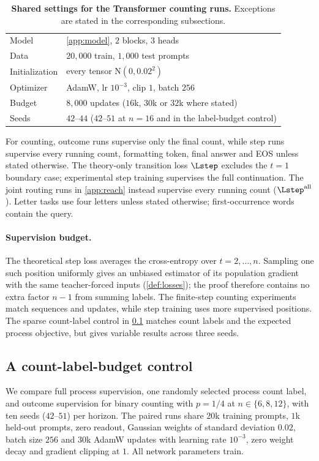 \begin{table}[H]
\centering\small
\begin{tabular}{@{}ll@{}}
\toprule
Model & \cref{app:model}, $2$ blocks, $3$ heads\\
Data & $20{,}000$ train, $1{,}000$ test prompts\\
Initialization & every tensor $\mathrm N(0,0.02^2)$\\
Optimizer & AdamW, lr $10^{-3}$, clip $1$, batch $256$\\
Budget & $8{,}000$ updates ($16$k, $30$k or $32$k where stated)\\
Seeds & $42$--$44$ ($42$--$51$ at $n=16$ and in the label-budget control)\\
\bottomrule
\end{tabular}
\caption{\textbf{Shared settings for the Transformer counting runs.} Exceptions are stated in the corresponding subsections.}
\label{tab:protocol}
\end{table}

For counting, outcome runs supervise only the final count, while step runs supervise every running count, formatting token,
final answer and EOS unless stated otherwise. The theory-only transition loss $\Lstep$ excludes the $t=1$ boundary case;
experimental step training supervises the full continuation. The joint routing runs in \cref{app:reach} instead supervise
every running count ($\Lstep^{\mathrm{all}}$). Letter tasks use four letters unless stated otherwise; first-occurrence words contain the query.

\paragraph{Supervision budget.}
The theoretical step loss averages the cross-entropy over $t=2,\ldots,n$.
Sampling one such position uniformly gives an unbiased estimator of its population
gradient with the same teacher-forced inputs (\cref{def:losses}); the proof therefore
contains no extra factor $n-1$ from summing labels. The finite-step counting experiments
match sequences and updates, while step training uses more supervised positions.
The sparse count-label control in \cref{app:label-budget} matches count labels
and the expected process objective, but gives variable results across three seeds.


\subsection{A count-label-budget control}
\label{app:label-budget}
We compare full process supervision, one randomly selected process count label, and outcome supervision for
binary counting with $p=1/4$ at $n\in\{6,8,12\}$, with ten seeds ($42$--$51$) per horizon. The paired runs share $20$k
training prompts, $1$k held-out prompts, zero readout, Gaussian weights of standard deviation $0.02$, batch size $256$ and
$30$k AdamW updates with learning rate $10^{-3}$, zero weight decay and gradient clipping at $1$. All network parameters train.

